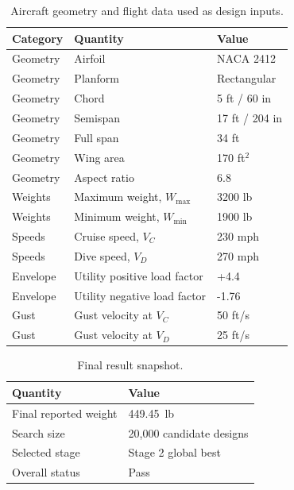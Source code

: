 \documentclass[11pt]{article}
\begin{document}
\begin{table}[H]
\centering
\caption{Aircraft geometry and flight data used as design inputs.}
\label{tab:projectdata}
\begin{tabular}{lll}
\toprule
Category & Quantity & Value \\
\midrule
Geometry & Airfoil & NACA 2412 \\
Geometry & Planform & Rectangular \\
Geometry & Chord & 5 ft / 60 in \\
Geometry & Semispan & 17 ft / 204 in \\
Geometry & Full span & 34 ft \\
Geometry & Wing area & 170 ft$^2$ \\
Geometry & Aspect ratio & 6.8 \\
Weights & Maximum weight, $W_{\max}$ & 3200 lb \\
Weights & Minimum weight, $W_{\min}$ & 1900 lb \\
Speeds & Cruise speed, $V_C$ & 230 mph \\
Speeds & Dive speed, $V_D$ & 270 mph \\
Envelope & Utility positive load factor & +4.4 \\
Envelope & Utility negative load factor & -1.76 \\
Gust & Gust velocity at $V_C$ & 50 ft/s \\
Gust & Gust velocity at $V_D$ & 25 ft/s \\
\bottomrule
\end{tabular}
\end{table}

\begin{table}[H]
\centering
\caption{Final result snapshot.}
\label{tab:finalcandidate}
\begin{tabular}{ll}
\toprule
Quantity & Value \\
\midrule
Final reported weight & \SI{449.45}{lb} \\
Search size & 20,000 candidate designs \\
Selected stage & Stage 2 global best \\
Overall status & Pass \\
\bottomrule
\end{tabular}
\end{table}
\end{document}

